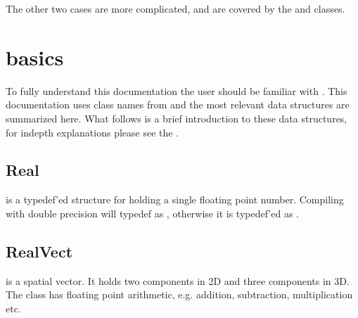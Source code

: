 \documentclass[letterpaper,10pt,english]{sphinxmanual}
\begin{document}
\sphinxAtStartPar
The other two cases are more complicated, and are covered by the {\hyperref[\detokenize{Source/GeoCoarsener:chap-geocoarsener}]{}} and {\hyperref[\detokenize{Source/CellTagger:chap-celltagger}]{}} classes.

\sphinxstepscope


\section{ basics}
\label{\detokenize{Source/ChomboBasics:chombo-3-basics}}\label{\detokenize{Source/ChomboBasics:chap-basics}}\label{\detokenize{Source/ChomboBasics::doc}}
\sphinxAtStartPar
To fully understand this documentation the user should be familiar with .
This documentation uses class names from  and the most relevant  data structures are summarized here.
What follows is a  brief introduction to these data structures, for in\sphinxhyphen{}depth explanations please see the .


\subsection{Real}
\label{\detokenize{Source/ChomboBasics:real}}
\sphinxAtStartPar
{} is a typedef’ed structure for holding a single floating point number.
Compiling with double precision will typedef  as , otherwise it is typedef’ed as .


\subsection{RealVect}
\label{\detokenize{Source/ChomboBasics:realvect}}
\sphinxAtStartPar
{} is a spatial vector.
It holds two  components in 2D and three  components in 3D.
The  class has floating point arithmetic, e.g. addition, subtraction, multiplication etc.
\end{document}
